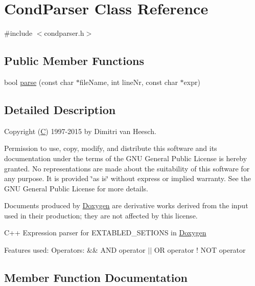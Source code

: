 \hypertarget{class_cond_parser}{}\section{Cond\+Parser Class Reference}
\label{class_cond_parser}


{\ttfamily \#include $<$condparser.\+h$>$}

\subsection*{Public Member Functions}
\begin{DoxyCompactItemize}
\item 
bool \mbox{\hyperlink{class_cond_parser_a81b78b3d5873b27da1d4dc1b7cdcb0b0}{parse}} (const char $\ast$file\+Name, int line\+Nr, const char $\ast$expr)
\end{DoxyCompactItemize}


\subsection{Detailed Description}
Copyright (\mbox{\hyperlink{class_c}{C}}) 1997-\/2015 by Dimitri van Heesch.

Permission to use, copy, modify, and distribute this software and its documentation under the terms of the G\+NU General Public License is hereby granted. No representations are made about the suitability of this software for any purpose. It is provided \char`\"{}as is\char`\"{} without express or implied warranty. See the G\+NU General Public License for more details.

Documents produced by \mbox{\hyperlink{class_doxygen}{Doxygen}} are derivative works derived from the input used in their production; they are not affected by this license.

C++ Expression parser for E\+X\+T\+A\+B\+L\+E\+D\+\_\+\+S\+E\+T\+I\+O\+NS in \mbox{\hyperlink{class_doxygen}{Doxygen}}

Features used\+: Operators\+: \&\& A\+ND operator $\vert$$\vert$ OR operator ! N\+OT operator 

\subsection{Member Function Documentation}
\mbox{\label{class_cond_parser_a81b78b3d5873b27da1d4dc1b7cdcb0b0}} 
